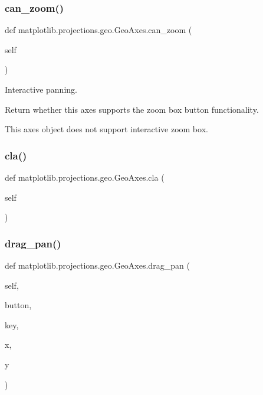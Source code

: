 \subsubsection{\texorpdfstring{can\+\_\+zoom()}{can\_zoom()}}
{\footnotesize\ttfamily def matplotlib.\+projections.\+geo.\+Geo\+Axes.\+can\+\_\+zoom (\begin{DoxyParamCaption}\item[{}]{self }\end{DoxyParamCaption})}



Interactive panning. 

\begin{DoxyVerb}Return whether this axes supports the zoom box button functionality.

This axes object does not support interactive zoom box.
\end{DoxyVerb}
 \mbox{\label{classmatplotlib_1_1projections_1_1geo_1_1GeoAxes_a96b4ecbdd2d29be9794481558170b549}} 
\subsubsection{\texorpdfstring{cla()}{cla()}}
{\footnotesize\ttfamily def matplotlib.\+projections.\+geo.\+Geo\+Axes.\+cla (\begin{DoxyParamCaption}\item[{}]{self }\end{DoxyParamCaption})}

\mbox{\label{classmatplotlib_1_1projections_1_1geo_1_1GeoAxes_acf91085372fa045dd21d1b31e9a6a6c3}} 
\subsubsection{\texorpdfstring{drag\+\_\+pan()}{drag\_pan()}}
{\footnotesize\ttfamily def matplotlib.\+projections.\+geo.\+Geo\+Axes.\+drag\+\_\+pan (\begin{DoxyParamCaption}\item[{}]{self,  }\item[{}]{button,  }\item[{}]{key,  }\item[{}]{x,  }\item[{}]{y }\end{DoxyParamCaption})}

